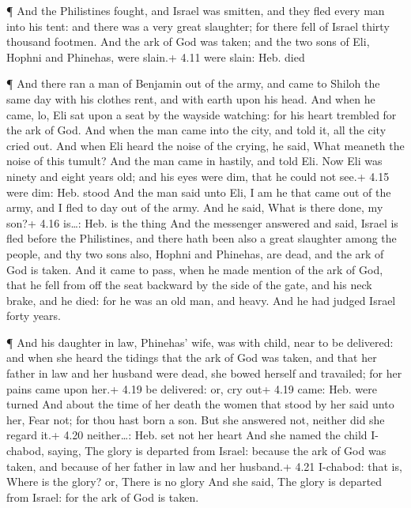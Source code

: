  ¶ And the Philistines fought, and Israel was smitten, and
they fled every man into his tent: and there was a very great slaughter;
for there fell of Israel thirty thousand footmen.  And the
ark of God was taken; and the two sons of Eli, Hophni and Phinehas, were
slain.+ 4.11 were slain: Heb. died

 ¶ And there ran a man of Benjamin out of the army, and
came to Shiloh the same day with his clothes rent, and with earth upon
his head.  And when he came, lo, Eli sat upon a seat by the
wayside watching: for his heart trembled for the ark of God. And when
the man came into the city, and told it, all the city cried out.
 And when Eli heard the noise of the crying, he said, What
meaneth the noise of this tumult? And the man came in hastily, and told
Eli.  Now Eli was ninety and eight years old; and his eyes
were dim, that he could not see.+ 4.15 were dim: Heb. stood
 And the man said unto Eli, I am he that came out of the
army, and I fled to day out of the army. And he said, What is there
done, my son?+ 4.16 is\ldots: Heb. is the thing  And the
messenger answered and said, Israel is fled before the Philistines, and
there hath been also a great slaughter among the people, and thy two
sons also, Hophni and Phinehas, are dead, and the ark of God is taken.
 And it came to pass, when he made mention of the ark of
God, that he fell from off the seat backward by the side of the gate,
and his neck brake, and he died: for he was an old man, and heavy. And
he had judged Israel forty years.

 ¶ And his daughter in law, Phinehas' wife, was with child,
near to be delivered: and when she heard the tidings that the ark of God
was taken, and that her father in law and her husband were dead, she
bowed herself and travailed; for her pains came upon her.+ 4.19 be
delivered: or, cry out+ 4.19 came: Heb. were turned  And
about the time of her death the women that stood by her said unto her,
Fear not; for thou hast born a son. But she answered not, neither did
she regard it.+ 4.20 neither\ldots: Heb. set not her heart 
And she named the child I-chabod, saying, The glory is departed from
Israel: because the ark of God was taken, and because of her father in
law and her husband.+ 4.21 I-chabod: that is, Where is the glory? or,
There is no glory  And she said, The glory is departed from
Israel: for the ark of God is taken.

